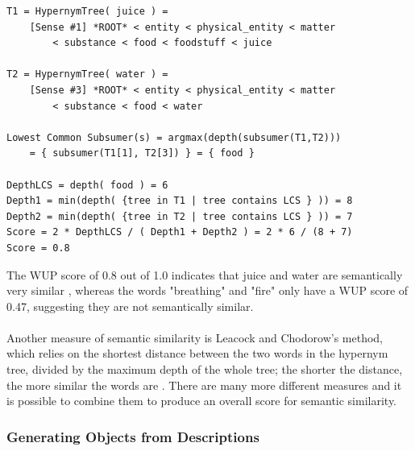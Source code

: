 \documentclass[11pt]{article}
\begin{document}
\begin{lstlisting}[frame=single]
T1 = HypernymTree( juice ) =
    [Sense #1] *ROOT* < entity < physical_entity < matter
    	< substance < food < foodstuff < juice

T2 = HypernymTree( water ) =
    [Sense #3] *ROOT* < entity < physical_entity < matter
    	< substance < food < water

Lowest Common Subsumer(s) = argmax(depth(subsumer(T1,T2)))
    = { subsumer(T1[1], T2[3]) } = { food }

DepthLCS = depth( food ) = 6
Depth1 = min(depth( {tree in T1 | tree contains LCS } )) = 8
Depth2 = min(depth( {tree in T2 | tree contains LCS } )) = 7
Score = 2 * DepthLCS / ( Depth1 + Depth2 ) = 2 * 6 / (8 + 7)
Score = 0.8
\end{lstlisting}

The WUP score of 0.8 out of 1.0 indicates that juice and water are semantically very similar \cite{RefWorks:47}, whereas the words "breathing" and "fire" only have a WUP score of 0.47, suggesting they are not semantically similar.
\\
\\
Another measure of semantic similarity is Leacock and Chodorow's method, which relies on the shortest distance between the two words in the hypernym tree, divided by the maximum depth of the whole tree; the shorter the distance, the more similar the words are \cite{RefWorks:46}. There are many more different measures and it is possible to combine them to produce an overall score for semantic similarity.

\subsubsection{Generating Objects from Descriptions}
\end{document}

